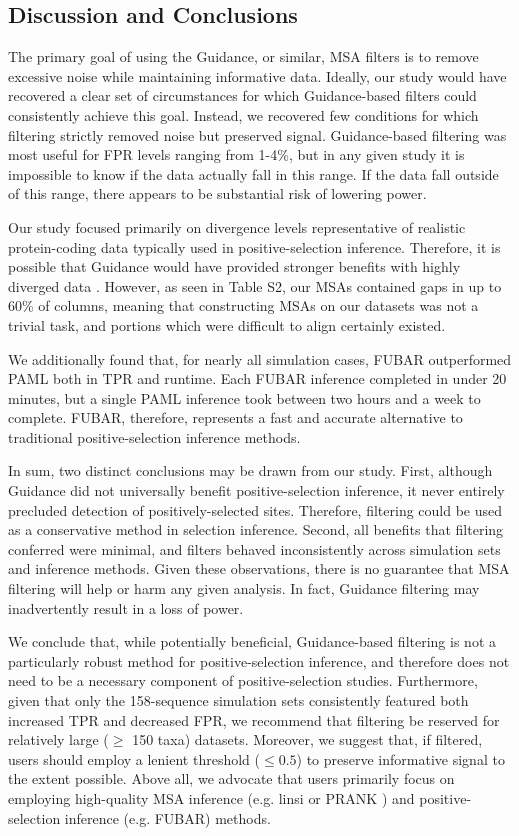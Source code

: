 \documentclass[11pt]{article}
\begin{document}
\subsection*{Discussion and Conclusions}

The primary goal of using the Guidance, or similar, MSA filters is to remove excessive noise while maintaining informative data. Ideally, our study would have recovered a clear set of circumstances for which Guidance-based filters could consistently achieve this goal. Instead, we recovered few conditions for which filtering strictly removed noise but preserved signal. Guidance-based filtering was most useful for FPR levels ranging from 1-4\%, but in any given study it is impossible to know if the data actually fall in this range. If the data fall outside of this range, there appears to be substantial risk of lowering power.

Our study focused primarily on divergence levels representative of realistic protein-coding data typically used in positive-selection inference. Therefore, it is possible that Guidance would have provided stronger benefits with highly diverged data \citep{Privman2012}. However, as seen in Table S2, our MSAs contained gaps in up to 60\% of columns, meaning that constructing MSAs on our datasets was not a trivial task, and portions which were difficult to align certainly existed.

We additionally found that, for nearly all simulation cases, FUBAR outperformed PAML both in TPR and runtime. Each FUBAR inference completed in under 20 minutes, but a single PAML inference took between two hours and a week to complete. FUBAR, therefore, represents a fast and accurate alternative to traditional positive-selection inference methods.

In sum, two distinct conclusions may be drawn from our study. First, although Guidance did not universally benefit positive-selection inference, it never entirely precluded detection of positively-selected sites. Therefore, filtering could be used as a conservative method in selection inference. Second, all benefits that filtering conferred were minimal, and filters behaved inconsistently across simulation sets and inference methods. Given these observations, there is no guarantee that MSA filtering will help or harm any given analysis. In fact,  Guidance filtering may inadvertently result in a loss of power.

We conclude that, while potentially beneficial, Guidance-based filtering is not a particularly robust method for positive-selection inference, and therefore does not need to be a necessary component of positive-selection studies. Furthermore, given that only the 158-sequence simulation sets consistently featured both increased TPR and decreased FPR, we recommend that filtering be reserved for relatively large ($\geq$ 150 taxa) datasets. Moreover, we suggest that, if filtered, users should employ a lenient threshold ($\leq0.5$) to preserve informative signal to the extent possible. Above all, we advocate that users primarily focus on employing high-quality MSA inference (e.g. linsi \citep{Katoh2005} or PRANK \citep{Loytynoja2008}) and positive-selection inference (e.g. FUBAR) methods. 
\end{document}
